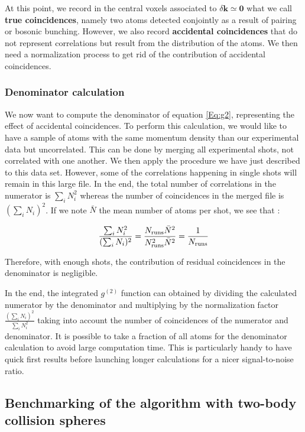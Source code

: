 At this point, we record in the central voxels associated to $\delta \bm{k} \simeq \bm{0}$ what we call \textbf{true coincidences}, namely two atoms detected conjointly as a result of \kmk pairing or bosonic bunching. However, we also record \textbf{accidental coincidences} that do not represent correlations but result from the distribution of the atoms. We then need a normalization process to get rid of the contribution of accidental coincidences. 

\subsubsection{Denominator calculation}

\label{sec:algo}

We now want to compute the denominator of equation \ref{Eq:g2}, representing the effect of accidental coincidences. To perform this calculation, we would like to have a sample of atoms with the same momentum density than our experimental data but uncorrelated. This can be done by merging all experimental shots, not correlated with one another. We then apply the procedure we have just described to this data set. However, some of the correlations happening in single shots will remain in this large file. In the end, the total number of correlations in the numerator is $\sum_i N_i^2$ whereas the number of coincidences in the merged file is $(\sum_i N_i)^2$. If we note $\bar{N}$ the mean number of atoms per shot, we see that :

\begin{equation}
      \frac{\sum_i N_i^2}{(\sum_i N_i)^2}=\frac{N_{\rm{runs}} \bar{N}^2}{N_{\rm{runs}}^2 \bar{N}^2}=\frac{1}{N_{\rm{runs}}}
\end{equation}{}

Therefore, with enough shots, the contribution of residual coincidences in the denominator is negligible. 

In the end, the integrated $g^{(2)}$ function can obtained by dividing the calculated numerator by the denominator and multiplying by the normalization factor $\frac{(\sum_i N_i)^2}{\sum_i N_i^2}$ taking into account the number of coincidences of the numerator and denominator. It is possible to take a fraction of all atoms for the denominator calculation to avoid large computation time. This is particularly handy to have quick first results before launching longer calculations for a nicer signal-to-noise ratio.

\subsection{Benchmarking of the algorithm with two-body collision spheres}

